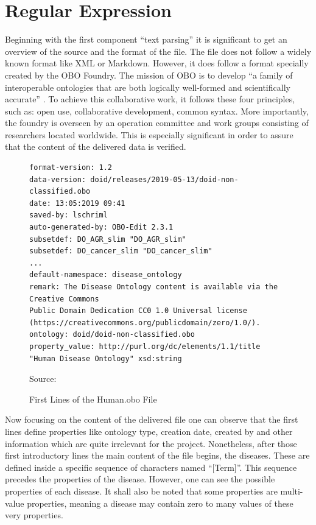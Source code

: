 \section{Regular Expression}
Beginning with the first component \enquote{text parsing} it is significant to get an overview of the source and the format of the file. The file does not follow a widely known format like XML or Markdown. However, it does follow a format specially created by the \ac{OBO} Foundry. The mission of \ac{OBO} is to develop \enquote{a family of interoperable ontologies that are both logically well-formed and scientifically accurate} \citep{do}. To achieve this collaborative work, it follows these four principles, such as: open use, collaborative development, common syntax. More importantly, the foundry is overseen by an operation committee and work groups consisting of researchers located worldwide. This is especially significant in order to assure  that the content of the delivered data is verified. 
\begin{figure}[H]
\centering
\begin{lstlisting}[]
format-version: 1.2
data-version: doid/releases/2019-05-13/doid-non-classified.obo
date: 13:05:2019 09:41
saved-by: lschriml
auto-generated-by: OBO-Edit 2.3.1
subsetdef: DO_AGR_slim "DO_AGR_slim"
subsetdef: DO_cancer_slim "DO_cancer_slim"
...
default-namespace: disease_ontology
remark: The Disease Ontology content is available via the Creative Commons 
Public Domain Dedication CC0 1.0 Universal license 
(https://creativecommons.org/publicdomain/zero/1.0/).
ontology: doid/doid-non-classified.obo
property_value: http://purl.org/dc/elements/1.1/title "Human Disease Ontology" xsd:string
\end{lstlisting}
\caption{First Lines of the Human.obo File}
Source: \citep{do}
\end{figure}
Now focusing on the content of the delivered file one can observe that the first lines define properties like ontology type, creation date, created by and other information which are quite irrelevant for the project. Nonetheless, after those first introductory lines the main content of the file begins, the diseases. These are defined inside a specific sequence of characters named “[Term]”. This sequence precedes the properties of the disease. However, one can see the possible properties of each disease. It shall also be noted that some properties are multi-value properties, meaning a disease may contain zero to many values of these very properties. 

